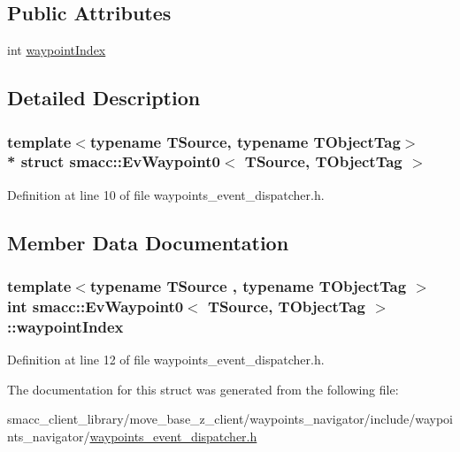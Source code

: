 \subsection*{Public Attributes}
\begin{DoxyCompactItemize}
\item 
int \hyperlink{structsmacc_1_1EvWaypoint0_a9af474f1be497c4a7c725487cfe0874b}{waypoint\+Index}
\end{DoxyCompactItemize}


\subsection{Detailed Description}
\subsubsection*{template$<$typename T\+Source, typename T\+Object\+Tag$>$\\*
struct smacc\+::\+Ev\+Waypoint0$<$ T\+Source, T\+Object\+Tag $>$}



Definition at line 10 of file waypoints\+\_\+event\+\_\+dispatcher.\+h.



\subsection{Member Data Documentation}
\subsubsection[{\texorpdfstring{waypoint\+Index}{waypointIndex}}]{\setlength{\rightskip}{0pt plus 5cm}template$<$typename T\+Source , typename T\+Object\+Tag $>$ int {\bf smacc\+::\+Ev\+Waypoint0}$<$ T\+Source, T\+Object\+Tag $>$\+::waypoint\+Index}\hypertarget{structsmacc_1_1EvWaypoint0_a9af474f1be497c4a7c725487cfe0874b}{}\label{structsmacc_1_1EvWaypoint0_a9af474f1be497c4a7c725487cfe0874b}


Definition at line 12 of file waypoints\+\_\+event\+\_\+dispatcher.\+h.



The documentation for this struct was generated from the following file\+:\begin{DoxyCompactItemize}
\item 
smacc\+\_\+client\+\_\+library/move\+\_\+base\+\_\+z\+\_\+client/waypoints\+\_\+navigator/include/waypoints\+\_\+navigator/\hyperlink{waypoints__event__dispatcher_8h}{waypoints\+\_\+event\+\_\+dispatcher.\+h}\end{DoxyCompactItemize}
